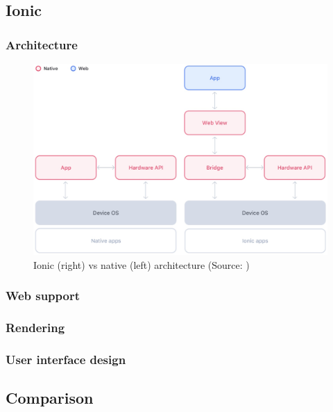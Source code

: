 \subsection{Ionic}

\subsubsection*{Architecture}

\begin{figure}[h]
	\centering
	\includegraphics[width=\textwidth]{img/ionic_architecture}
	\caption{Ionic (right) vs native (left) architecture (Source: \cite{ionic_docs_architecture})}
	\label{fig:ionic_architecture}
\end{figure}

\subsubsection*{Web support}

\subsubsection*{Rendering}

\subsubsection*{User interface design}

\subsection{Comparison}

